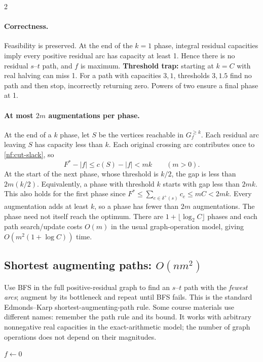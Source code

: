\documentclass[10pt]{article}
\theoremstyle{definition}
\begin{document}
\begin{multicols*}{2}
\paragraph{Correctness.}
Feasibility is preserved. At the end of the $k=1$ phase, integral residual
capacities imply every positive residual arc has capacity at least 1. Hence
there is no residual $s$--$t$ path, and $f$ is maximum.
\textbf{Threshold trap:} starting at $k=C$ with real halving can miss 1.
For a path with capacities $3,1$, thresholds $3,1.5$ find no path and then
stop, incorrectly returning zero. Powers of two ensure a final phase at 1.

\paragraph{At most $2m$ augmentations per phase.}
At the end of a $k$ phase, let $S$ be the vertices reachable in
$G_f^{\ge k}$. Each residual arc leaving $S$ has capacity less than $k$.
Each original crossing arc contributes once to \eqref{nf:cut-slack}, so
\[
 F^*-|f|\le c(S)-|f|<mk\qquad(m>0).
\]
At the start of the next phase, whose threshold is $k/2$, the gap is less
than $2m(k/2)$. Equivalently, a phase with threshold $k$ starts with gap
less than $2mk$. This also holds for the first phase since
$F^*\le\sum_{e\in\delta^+(s)}c_e\le mC<2mk$.
Every augmentation adds at least $k$, so a phase has fewer than $2m$
augmentations. The phase need not itself reach the optimum.
There are $1+\lfloor\log_2 C\rfloor$ phases and each path search/update costs
$O(m)$ in the usual graph-operation model, giving $O(m^2(1+\log C))$ time.

\subsection{Shortest augmenting paths: \texorpdfstring{$O(nm^2)$}{O(n m squared)}}\label{nf:sap}
Use BFS in the full positive-residual graph to find an $s$--$t$ path with the
\emph{fewest arcs}; augment by its bottleneck and repeat until BFS fails.
This is the standard Edmonds--Karp shortest-augmenting-path rule. Some course
materials use different names: remember the path rule and its bound.
It works with arbitrary nonnegative real capacities in the exact-arithmetic
model; the number of graph operations does not depend on their magnitudes.


\begin{algorithm}[H]
\caption{Shortest augmenting paths (BFS; not arbitrary path choice)}
$f\gets0$\;
\;
\end{algorithm}


\end{multicols*}
\end{document}

